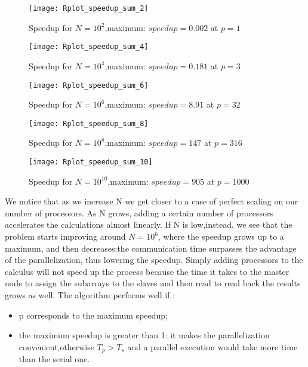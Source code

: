 \documentclass[11pt]{scrartcl} %
\begin{document}
\begin{figure}[H] %
	\centering
	\texttt{[image: Rplot\_speedup\_sum\_2]} %
	\caption{Speedup for $N=10^2$,maximum: $speedup = 0.002$ at $p = 1$}
\end{figure}


\begin{figure}[H] %
	\centering
	\texttt{[image: Rplot\_speedup\_sum\_4]} %
	\caption{Speedup for $N=10^4$,maximum: $speedup = 0.181$ at $p = 3$}
\end{figure}
\begin{figure}[H] %
	\centering
	\texttt{[image: Rplot\_speedup\_sum\_6]} %
	\caption{Speedup for $N=10^6$,maximum: $speedup = 8.91$ at $p = 32$}
\end{figure}
\begin{figure}[H] %
	\centering
	\texttt{[image: Rplot\_speedup\_sum\_8]} %
	\caption{Speedup for $N=10^8$,maximum: $speedup = 147$ at $p = 316$}
\end{figure}
\begin{figure}[H] %
	\centering
	\texttt{[image: Rplot\_speedup\_sum\_10]} %
	\caption{Speedup for $N=10^{10}$,maximum: $speedup = 905$ at $p = 1000$}
\end{figure}

We notice that as we increase N we get closer to a case of perfect scaling on our number of processors. As N grows, adding a certain number of processors accelerates the calculations almost linearly.
If N is low,instead, we see that the problem starts improving around $N=10^6$, where the speedup grows up to a maximum, and then decreases:the communication time surpasses the advantage of the parallelization, thus lowering the speedup.
 Simply adding processors to the calculus will not speed up the process because the time it takes to the master node to assign the subarrays to the slaves and then read to read back the results grows as well.
The algorithm performs well if :
\begin{itemize}
	\item p corresponds to the maximum speedup;
	\item the maximum speedup is greater than 1: it makes the parallelization convenient,otherwise $T_p>T_s$ and a parallel execution would take more time than the serial one.
\end{itemize}
\end{document}
